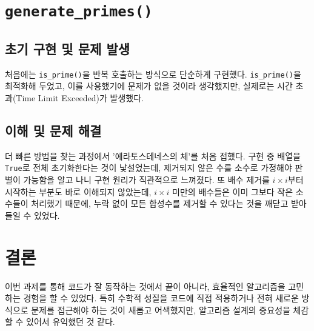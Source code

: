 \documentclass[11pt,a4paper]{article}
\begin{document}
\section{\texttt{generate\_primes()}}

    \subsection{초기 구현 및 문제 발생}

        처음에는 \texttt{is\_prime()}을 반복 호출하는 방식으로 단순하게 구현했다.
        \texttt{is\_prime()}을 최적화해 두었고, 이를 사용했기에 문제가 없을 것이라 생각했지만,
        실제로는 시간 초과(Time Limit Exceeded)가 발생했다.

    \subsection{이해 및 문제 해결}

        더 빠른 방법을 찾는 과정에서 '에라토스테네스의 체'를 처음 접했다.
        구현 중 배열을 \texttt{True}로 전체 초기화한다는 것이 낯설었는데, 제거되지 않은 수를 소수로 가정해야 판별이 가능함을 알고 나니 구현 원리가 직관적으로 느껴졌다.
        또 배수 제거를 $i \times i$부터 시작하는 부분도 바로 이해되지 않았는데,
        $i \times i$ 미만의 배수들은 이미 그보다 작은 소수들이 처리했기 때문에, 누락 없이 모든 합성수를 제거할 수 있다는 것을 깨닫고 받아들일 수 있었다.


\section{결론}

        이번 과제를 통해 코드가 잘 동작하는 것에서 끝이 아니라, 효율적인 알고리즘을 고민하는 경험을 할 수 있었다.
        특히 수학적 성질을 코드에 직접 적용하거나 전혀 새로운 방식으로 문제를 접근해야 하는 것이 새롭고 어색했지만, 
        알고리즘 설계의 중요성을 체감할 수 있어서 유익했던 것 같다.
        
\end{document}
